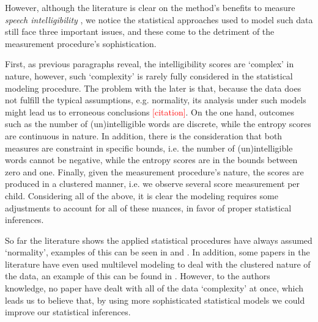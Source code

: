 However, although the literature is clear on the method's benefits to measure \textit{speech intelligibility} \citep{Boonen_et_al_2020, Boonen_et_al_2021, Hustad_et_al_2020}, we notice the statistical approaches used to model such data still face three important issues, and these come to the detriment of the measurement procedure's sophistication. 

First, as previous paragraphs reveal, the intelligibility scores are `complex' in nature, however, such `complexity' is rarely fully considered in the statistical modeling procedure. The problem with the later is that, because the data does not fulfill the typical assumptions, e.g. normality, its analysis under such models might lead us to erroneous conclusions \textcolor{red}{[citation]}. On the one hand, outcomes such as the number of (un)intelligible words are discrete, while the entropy scores are continuous in nature. In addition, there is the consideration that both measures are constraint in specific bounds, i.e. the number of (un)intelligible words cannot be negative, while the entropy scores are in the bounds between zero and one. Finally, given the measurement procedure's nature, the scores are produced in a clustered manner, i.e. we observe several score measurement per child. Considering all of the above, it is clear the modeling requires some adjustments to account for all of these nuances, in favor of proper statistical inferences.

So far the literature shows the applied statistical procedures have always assumed `normality', examples of this can be seen in \citet{Boonen_et_al_2021, Flipsen_et_al_2006} and \citet{Hustad_et_al_2020}. In addition, some papers in the literature have even used multilevel modeling to deal with the clustered nature of the data, an example of this can be found in \citet{Boonen_et_al_2021}. However, to the authors knowledge, no paper have dealt with all of the data `complexity' at once, which leads us to believe that, by using more sophisticated statistical models we could improve our statistical inferences. 

\begin{comment}
	Second, an related to the previous issue, no attempt on constructing an actual intelligibility score is made, and therefore, the modeling procedure is applied on surrogate measures, like entropy, but not directly on what it is intended to be measure. For instance, \citet{Flipsen_2006} uses 
	
	third, many factors are though to influence intelligibility, but the framework in which they are analyzed does not allow to make causal hypothesis. Moreover, it might suffer from problems like including variables that are multicollinear
	

From the previous, we believe the field can further benefit from using much more sophisticated statistical analysis tools, than the ones currently used. 
\end{comment}


